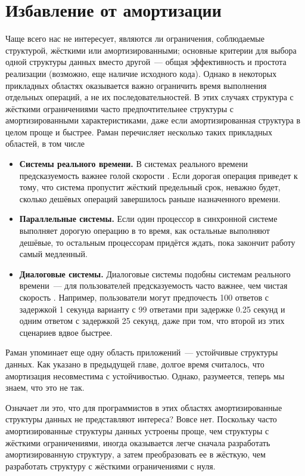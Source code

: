 \chapter{Избавление от амортизации}
\label{ch:7}

Чаще всего нас не интересует, являются ли ограничения, соблюдаемые
структурой, жёсткими или амортизированными; основные критерии для
выбора одной структуры данных вместо другой~--- общая эффективность и
простота реализации (возможно, еще наличие исходного кода). Однако в
некоторых прикладных областях оказывается важно ограничить время
выполнения отдельных операций, а не их последовательностей. В
этих случаях структура с жёсткими ограничениями часто предпочтительнее
структуры с амортизированными характеристиками, даже если
амортизированная структура в целом проще и быстрее. Раман
\cite{Raman1992} перечисляет несколько таких прикладных областей, в
том числе
\begin{itemize}
\item \textbf{Системы реального времени.} В системах реального времени
  предсказуемость важнее голой скорости \cite{Stankovic1988}. Если
  дорогая операция приведет к тому, что система пропустит жёсткий
  предельный срок, неважно будет, сколько дешёвых операций завершилось
  раньше назначенного времени.
\item \textbf{Параллельные системы.} Если один процессор в синхронной
  системе выполняет дорогую операцию в то время, как остальные
  выполняют дешёвые, то остальным процессорам придётся ждать, пока
  закончит работу самый медленный.
\item \textbf{Диалоговые системы.} Диалоговые системы подобны системам
  реального времени~--- для пользователей предсказуемость часто
  важнее, чем чистая скорость \cite{Butler1983}. Например,
  пользователи могут предпочесть 100 ответов с задержкой 1 секунда
  варианту с 99 ответами при задержке 0.25 секунд и одним ответом с
  задержкой 25 секунд, даже при том, что второй из этих сценариев
  вдвое быстрее.
\end{itemize}
\begin{remark}
  Раман упоминает еще одну область приложений~--- устойчивые структуры
  данных. Как указано в предыдущей главе, долгое время считалось,
  что амортизация несовместима с устойчивостью. Однако, разумеется,
  теперь мы знаем, что это не так.
\end{remark}

Означает ли это, что для программистов в этих областях
амортизированные структуры данных не представляют интереса? Вовсе
нет. Поскольку часто амортизированные структуры данных устроены проще,
чем структуры с жёсткими ограничениями, иногда оказывается легче
сначала разработать амортизированную структуру, а затем преобразовать
ее в жёсткую, чем разработать структуру с жёсткими ограничениями с
нуля.

